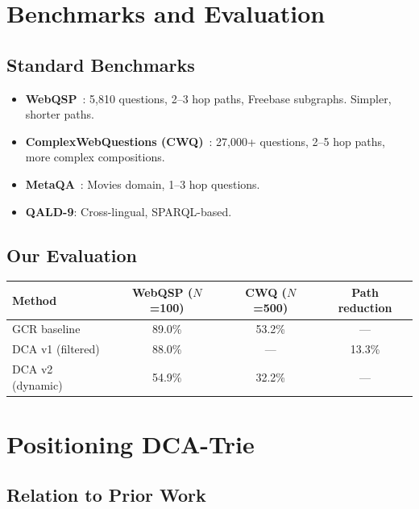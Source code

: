 \documentclass[11pt,a4paper]{article}
\begin{document}
\section{Benchmarks and Evaluation}

\subsection{Standard Benchmarks}

\begin{itemize}
  \item \textbf{WebQSP}~\cite{webqsp}: 5,810 questions, 2--3 hop paths,
    Freebase subgraphs.  Simpler, shorter paths.
  \item \textbf{ComplexWebQuestions (CWQ)}~\cite{cwq}: 27,000+ questions,
    2--5 hop paths, more complex compositions.
  \item \textbf{MetaQA}~\cite{metaqa}: Movies domain, 1--3 hop questions.
  \item \textbf{QALD-9}: Cross-lingual, SPARQL-based.
\end{itemize}

\subsection{Our Evaluation}

\begin{center}
\begin{tabular}{@{}lccc@{}}
\toprule
  Method & WebQSP ($N$=100) & CWQ ($N$=500) & Path reduction \\
\midrule
  GCR baseline      & 89.0\% & 53.2\% & --- \\
  DCA v1 (filtered) & 88.0\% & ---    & 13.3\% \\
  DCA v2 (dynamic)  & 54.9\% & 32.2\% & --- \\
\bottomrule
\end{tabular}
\end{center}

\section{Positioning DCA-Trie}

\subsection{Relation to Prior Work}
\end{document}
